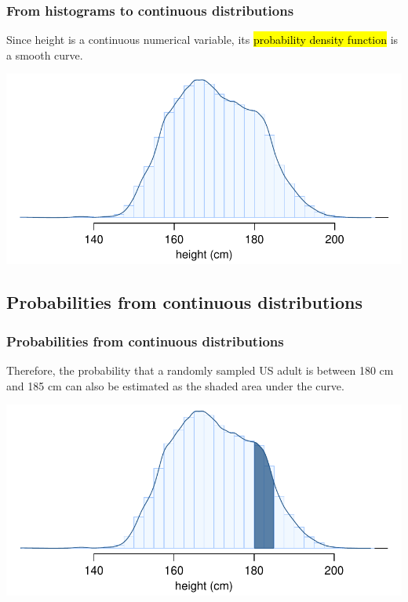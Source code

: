 \begin{frame}
\frametitle{From histograms to continuous distributions}

Since height is a continuous numerical variable, its \hl{probability density function} is a smooth curve.

\begin{center}
\includegraphics[width=\textwidth]{3-5_continuous_distributions/figures/fdicHeightContDist/fdicHeightContDist}
\end{center}

\end{frame}


\subsection{Probabilities from continuous distributions}

\begin{frame}
\frametitle{Probabilities from continuous distributions}

Therefore, the probability that a randomly sampled US adult is between 180 cm and 185 cm can also be estimated as the shaded area under the curve.

\begin{center}
\includegraphics[width=\textwidth]{3-5_continuous_distributions/figures/fdicHeightContDistFilled/fdicHeightContDistFilled}
\end{center}


\end{frame}

